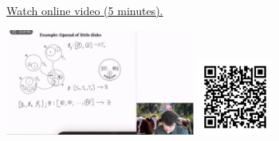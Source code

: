 
\begin{minipage}{10cm}
    \href{https://act4e-spring21.netlify.app/videos/spring2021-operads-a:operad-disks.html}{Watch online video (5 minutes).}
        
    \href{https://act4e-spring21.netlify.app/videos/spring2021-operads-a:operad-disks.html}{\includegraphics[height=3.5cm]{spring2021-operads-a:operad-disks/thumbnails.jpg}}
    \href{https://act4e-spring21.netlify.app/videos/spring2021-operads-a:operad-disks.html}{\includegraphics[height=2.5cm]{spring2021-operads-a:operad-disks/qrcode.png}}
\end{minipage}
